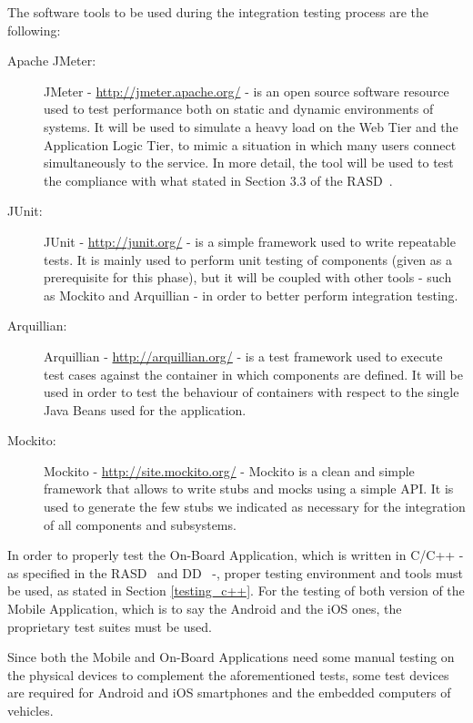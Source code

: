 The software tools to be used during the integration testing process are the following:

\begin{description}
\item[Apache JMeter:] JMeter - \url{http://jmeter.apache.org/} - is an open source software resource used to test performance both on static and dynamic environments of systems. It will be used to simulate a heavy load on the Web Tier and the Application Logic Tier, to mimic a situation in which many users connect simultaneously to the service. In more detail, the tool will be used to test the compliance with what stated in Section 3.3 of the RASD~\cite{rasd}.
\item[JUnit:] JUnit - \url{http://junit.org/} - is a simple framework used to write repeatable tests. It is mainly used to perform unit testing of components (given as a prerequisite for this phase), but it will be coupled with other tools - such as Mockito and Arquillian - in order to better perform integration testing.
\item[Arquillian:] Arquillian - \url{http://arquillian.org/} - is a test framework used to execute test cases against the container in which components are defined. It will be used in order to test the behaviour of containers with respect to the single Java Beans used for the application.
\item[Mockito:] Mockito - \url{http://site.mockito.org/} - Mockito is a clean and simple framework that allows to write stubs and mocks using a simple API. It is used to generate the few stubs we indicated as necessary for the integration of all components and subsystems.
\end{description}

In order to properly test the On-Board Application, which is written in C/C++ - as specified in the RASD~\cite{rasd} and DD~\cite{dd} -, proper testing environment and tools must be used, as stated in Section \ref{testing_c++}. For the testing of both version of the Mobile Application, which is to say the Android and the iOS ones, the proprietary test suites must be used.

Since both the Mobile and On-Board Applications need some manual testing on the physical devices to complement the aforementioned tests, some test devices are required for Android and iOS smartphones and the embedded computers of vehicles.